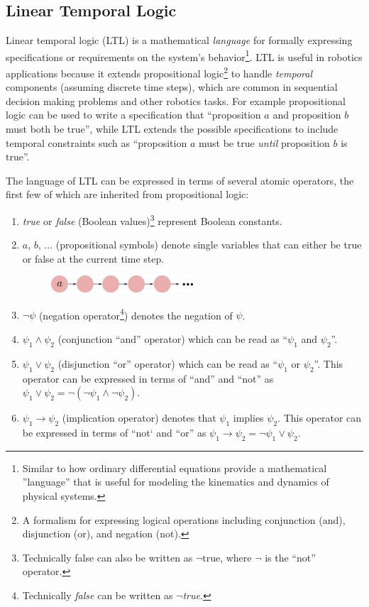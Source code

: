 \subsection{Linear Temporal Logic} \label{subsec:ltl}
Linear temporal logic (LTL) is a mathematical \textit{language} for formally expressing specifications or requirements on the system's behavior\footnote{Similar to how ordinary differential equations provide a mathematical ''language'' that is useful for modeling the kinematics and dynamics of physical systems.}. LTL is useful in robotics applications because it extends propositional logic\footnote{A formalism for expressing logical operations including conjunction (and), disjunction (or), and negation (not).} to handle \textit{temporal} components (assuming discrete time steps), which are common in sequential decision making problems and other robotics tasks. For example propositional logic can be used to write a specification that ``proposition $a$ and proposition $b$ must both be true'', while LTL extends the possible specifications to include temporal constraints such as ``proposition $a$ must be true \textit{until} proposition $b$ is true''.

The language of LTL can be expressed in terms of several atomic operators, the first few of which are inherited from propositional logic:
\begin{enumerate}
    \item \textit{true} or \textit{false} (Boolean values)\footnote{Technically false can also be written as $\lnot \text{true}$, where $\lnot$ is the ``not'' operator.} represent Boolean constants.
    \item $a$, $b$, $\dots$ (propositional symbols) denote single variables that can either be true or false at the current time step.
    \begin{figure}[ht]
    \begin{center}
    \includegraphics[width=0.5\textwidth]{tex/figs/ch25_figs/prop.png}
    \label{fig:propositionalvar}
    \end{center}
    \vspace{-\baselineskip}
    \end{figure}
    \item $\lnot \psi$ (negation operator\footnote{Technically \textit{false} can be written as $\lnot$\textit{true}.}) denotes the negation of $\psi$.
    \item $\psi_1 \land \psi_2$ (conjunction ``and'' operator) which can be read as ``$\psi_1$ and $\psi_2$''.
    \item $\psi_1 \lor \psi_2$ (disjunction ``or'' operator) which can be read as ``$\psi_1$ or $\psi_2$''. This operator can be expressed in terms of ``and'' and ``not'' as $\psi_1 \lor \psi_2 = \lnot(\lnot \psi_1 \land \lnot \psi_2)$.
    \item $\psi_1 \to \psi_2$ (implication operator) denotes that $\psi_1$ implies $\psi_2$. This operator can be expressed in terms of ``not` and ``or'' as $\psi_1 \to \psi_2 = \lnot \psi_1 \lor \psi_2$.
\end{enumerate}

